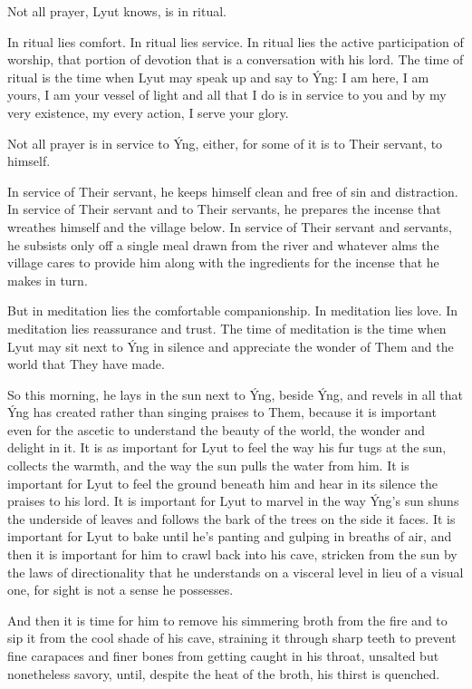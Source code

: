 Not all prayer, Lyut knows, is in ritual.

In ritual lies comfort. In ritual lies service. In ritual lies the active participation of worship, that portion of devotion that is a conversation with his lord. The time of ritual is the time when Lyut may speak up and say to Ýng: I am here, I am yours, I am your vessel of light and all that I do is in service to you and by my very existence, my every action, I serve your glory.

Not all prayer is in service to Ýng, either, for some of it is to Their servant, to himself.

In service of Their servant, he keeps himself clean and free of sin and distraction. In service of Their servant and to Their servants, he prepares the incense that wreathes himself and the village below. In service of Their servant and servants, he subsists only off a single meal drawn from the river and whatever alms the village cares to provide him along with the ingredients for the incense that he makes in turn.

But in meditation lies the comfortable companionship. In meditation lies love. In meditation lies reassurance and trust. The time of meditation is the time when Lyut may sit next to Ýng in silence and appreciate the wonder of Them and the world that They have made.

So this morning, he lays in the sun next to Ýng, beside Ýng, and revels in all that Ýng has created rather than singing praises to Them, because it is important even for the ascetic to understand the beauty of the world, the wonder and delight in it. It is as important for Lyut to feel the way his fur tugs at the sun, collects the warmth, and the way the sun pulls the water from him. It is important for Lyut to feel the ground beneath him and hear in its silence the praises to his lord. It is important for Lyut to marvel in the way Ýng's sun shuns the underside of leaves and follows the bark of the trees on the side it faces. It is important for Lyut to bake until he's panting and gulping in breaths of air, and then it is important for him to crawl back into his cave, stricken from the sun by the laws of directionality that he understands on a visceral level in lieu of a visual one, for sight is not a sense he possesses.

And then it is time for him to remove his simmering broth from the fire and to sip it from the cool shade of his cave, straining it through sharp teeth to prevent fine carapaces and finer bones from getting caught in his throat, unsalted but nonetheless savory, until, despite the heat of the broth, his thirst is quenched.

